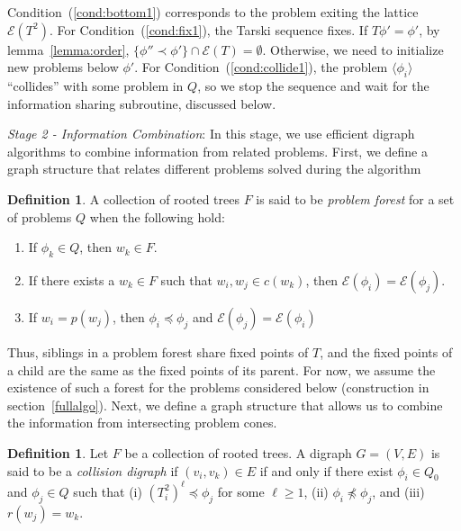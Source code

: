 \documentclass[11pt,reqno]{amsart}
\theoremstyle{definition}
\newtheorem{defn}[thm]{Definition}
\numberwithin{equation}{section}
\newcommand{\lag}{\langle}
\newcommand{\rag}{\rangle}
\newcommand{\pre}{\phi}
\newcommand{\fix}{\mathcal{E}}
\newcommand{\peq}{\preceq}
\newcommand{\pe}{\prec}
\newcommand{\acto}{Q_0}
\newcommand{\act}{Q}
\newcommand{\forest}{F}
\begin{document}
Condition~(\ref{cond:bottom1}) corresponds to the problem exiting the lattice $\fix(T^2)$. 
For Condition~(\ref{cond:fix1}), the Tarski sequence fixes.
If $T\pre' = \pre'$, by lemma~\ref{lemma:order}, $\{\pre'' \pe \pre'\} \cap \fix(T) = \emptyset$. 
Otherwise, we need to initialize new problems below $\pre'$.
For Condition~(\ref{cond:collide1}), the problem $\lag \pre_i \rag$ ``collides'' with some problem in $\act$, so we stop the sequence and wait for the information sharing subroutine, discussed below.

\emph{Stage 2 - Information Combination}: In this stage, we use efficient digraph algorithms to combine information from related problems.
First, we define a graph structure that relates different problems solved during the algorithm
\begin{defn} \label{def:forest}
A collection of rooted trees $\forest$ is said to be \emph{problem forest} for a set of problems $\act$ when the following hold:

\begin{enumerate}
\item If $\pre_k \in Q$, then $w_k \in \forest$. \label{def:forest1}
\item If there exists a $w_k \in F$ such that $w_i, w_j \in c(w_k)$, then $\fix(\pre_i) = \fix(\pre_j)$. \label{def:forest2}
\item If $w_i = p(w_j)$, then $\pre_i \peq \pre_j$ and $\fix(\pre_j) = \fix(\pre_i)$ \label{def:forest3} 
\end{enumerate} 

\end{defn}

Thus, siblings in a problem forest share fixed points of $T$, and the fixed points of a child are the same as the fixed points of its parent. 
For now, we assume the existence of such a forest for the problems considered below (construction in section~\ref{fullalgo}). Next, we define a graph structure that allows us to combine the information from intersecting problem cones.

\begin{defn} \label{def:graph}
Let $\forest$ be a collection of rooted trees. A digraph $G = (V,E)$ is said to be a \emph{collision digraph} if $(v_i,v_k) \in E$ if and only if there exist $\pre_i \in \acto$ and $\pre_j \in \act$ such that (i) $(T_i^2)^{\ell} \peq \pre_j$ for some $\ell \geq 1$, (ii) $\pre_i \not \peq \pre_j$, and (iii) $r(w_j) = w_k$.
\end{defn}
\end{document}
